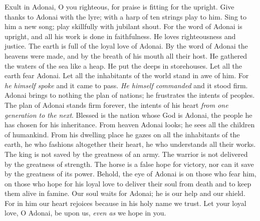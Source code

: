 \begin{biblechapter} %
 Exult in Adonai, O you righteous, 
for praise is fitting for the upright.
\verse Give thanks to Adonai with the lyre; 
with a harp of ten strings play to him.
\verse Sing to him a new song; 
play skillfully with jubilant shout.
\verse For the word of Adonai is upright, 
and all his work is done in faithfulness.
\verse He loves righteousness and justice. 
The earth is full of the loyal love of Adonai.
\verse By the word of Adonai the heavens were made, 
and by the breath of his mouth all their host.
\verse He gathered the waters of the sea like a heap. 
He put the deeps in storehouses.
\verse Let all the earth fear Adonai. 
Let all the inhabitants of the world stand in awe of him.
\verse For \textit{he himself spoke} and it came to pass. 
\textit{He himself commanded} and it stood firm.
\verse Adonai brings to nothing the plan of nations; 
he frustrates the intents of peoples.
\verse The plan of Adonai stands firm forever, 
the intents of his heart \textit{from one generation to the next}.
\verse Blessed is the nation whose God is Adonai, 
the people he has chosen for his inheritance.
\verse From heaven Adonai looks; 
he sees all the children of humankind.
\verse From his dwelling place he gazes 
on all the inhabitants of the earth,
\verse he who fashions altogether their heart, 
he who understands all their works.
\verse The king is not saved by the greatness of an army. 
The warrior is not delivered by the greatness of strength.
\verse The horse is a false hope for victory, 
nor can it save by the greatness of its power.
\verse Behold, the eye of Adonai is on those who fear him, 
on those who hope for his loyal love
\verse to deliver their soul from death 
and to keep them alive in famine.
\verse Our soul waits for Adonai; 
he is our help and our shield.
\verse For in him our heart rejoices 
because in his holy name we trust.
\verse Let your loyal love, O Adonai, be upon us, 
\textit{even as} we hope in you.
\end{biblechapter}

